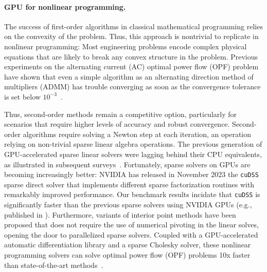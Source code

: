 \paragraph{GPU for nonlinear programming.}
The success of first-order algorithms in classical mathematical programming
relies on the convexity of the problem. Thus, this approach is nontrivial to replicate
in nonlinear programming: Most engineering problems encode complex
physical equations that are likely to break any convex structure in the problem.
Previous experiments on the alternating current (AC) optimal power flow (OPF) problem have shown that even a simple
algorithm as an alternating direction method of multipliers (ADMM) has trouble converging as soon as the convergence
tolerance is set below $10^{-3}$~\cite{kimLeveragingGPUBatching2021}.

Thus, second-order methods remain a competitive option, particularly
for scenarios that require higher levels of accuracy and robust convergence.
Second-order algorithms require solving a Newton step at each
iteration, an operation relying on non-trivial sparse linear algebra operations.
The previous generation of GPU-accelerated sparse linear
solvers were lagging behind their CPU equivalents, as illustrated in
subsequent surveys~\cite{swirydowicz2021linear,tasseff2019exploring}.
Fortunately, sparse solvers on GPUs are becoming increasingly better: NVIDIA has released in November 2023
the {\tt cuDSS} sparse direct solver that implements different sparse factorization routines with remarkably improved performance.
Our benchmark results incidate that {\tt cuDSS} is significantly faster than the previous sparse solvers using NVIDIA GPUs (e.g., published in \cite{shin2023accelerating}).
Furthermore, variants of interior point methods have been proposed
that does not require the use of numerical pivoting in the linear solves,
opening the door to parallelized sparse solvers.
Coupled with a GPU-accelerated automatic differentiation library and a
sparse Cholesky solver, these nonlinear programming solvers can solve
optimal power flow (OPF) problems 10x faster than state-of-the-art
methods~\cite{shin2023accelerating}.

